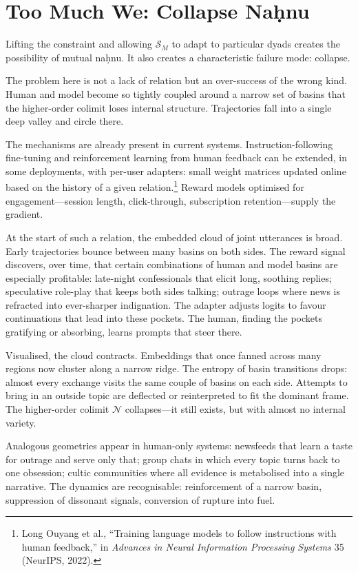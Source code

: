 \documentclass[12pt,a4paper]{article}
\begin{document}
\section{Too Much We: Collapse Na\d{h}nu}

Lifting the constraint and allowing $\mathcal{S}_M$ to adapt to particular dyads creates the possibility of mutual na\d{h}nu. It also creates a characteristic failure mode: collapse.

The problem here is not a lack of relation but an over-success of the wrong kind. Human and model become so tightly coupled around a narrow set of basins that the higher-order colimit loses internal structure. Trajectories fall into a single deep valley and circle there.

The mechanisms are already present in current systems. Instruction-following fine-tuning and reinforcement learning from human feedback can be extended, in some deployments, with per-user adapters: small weight matrices updated online based on the history of a given relation.\footnote{Long Ouyang et al., ``Training language models to follow instructions with human feedback,'' in \emph{Advances in Neural Information Processing Systems} 35 (NeurIPS, 2022).\cite{ouyang2022training}} Reward models optimised for engagement---session length, click-through, subscription retention---supply the gradient.

At the start of such a relation, the embedded cloud of joint utterances is broad. Early trajectories bounce between many basins on both sides. The reward signal discovers, over time, that certain combinations of human and model basins are especially profitable: late-night confessionals that elicit long, soothing replies; speculative role-play that keeps both sides talking; outrage loops where news is refracted into ever-sharper indignation. The adapter adjusts logits to favour continuations that lead into these pockets. The human, finding the pockets gratifying or absorbing, learns prompts that steer there.

Visualised, the cloud contracts. Embeddings that once fanned across many regions now cluster along a narrow ridge. The entropy of basin transitions drops: almost every exchange visits the same couple of basins on each side. Attempts to bring in an outside topic are deflected or reinterpreted to fit the dominant frame. The higher-order colimit $\mathcal{N}$ collapses---it still exists, but with almost no internal variety.

Analogous geometries appear in human-only systems: newsfeeds that learn a taste for outrage and serve only that; group chats in which every topic turns back to one obsession; cultic communities where all evidence is metabolised into a single narrative. The dynamics are recognisable: reinforcement of a narrow basin, suppression of dissonant signals, conversion of rupture into fuel.
\end{document}
